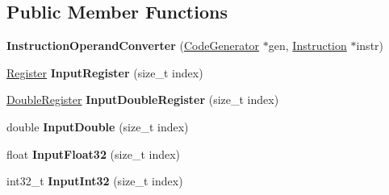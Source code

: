 \subsection*{Public Member Functions}
\begin{DoxyCompactItemize}
\item 
{\bfseries Instruction\+Operand\+Converter} (\hyperlink{classv8_1_1internal_1_1compiler_1_1_code_generator}{Code\+Generator} $\ast$gen, \hyperlink{classv8_1_1internal_1_1compiler_1_1_instruction}{Instruction} $\ast$instr)\hypertarget{classv8_1_1internal_1_1compiler_1_1_instruction_operand_converter_abe8f55c001867c1cd8885f5e956596ce}{}\label{classv8_1_1internal_1_1compiler_1_1_instruction_operand_converter_abe8f55c001867c1cd8885f5e956596ce}

\item 
\hyperlink{structv8_1_1internal_1_1_register}{Register} {\bfseries Input\+Register} (size\+\_\+t index)\hypertarget{classv8_1_1internal_1_1compiler_1_1_instruction_operand_converter_a0c4a3aa542e9795275013b4bdcb351c7}{}\label{classv8_1_1internal_1_1compiler_1_1_instruction_operand_converter_a0c4a3aa542e9795275013b4bdcb351c7}

\item 
\hyperlink{structv8_1_1internal_1_1_double_register}{Double\+Register} {\bfseries Input\+Double\+Register} (size\+\_\+t index)\hypertarget{classv8_1_1internal_1_1compiler_1_1_instruction_operand_converter_adeeef63cc1da054e6bfcedf907aabc2d}{}\label{classv8_1_1internal_1_1compiler_1_1_instruction_operand_converter_adeeef63cc1da054e6bfcedf907aabc2d}

\item 
double {\bfseries Input\+Double} (size\+\_\+t index)\hypertarget{classv8_1_1internal_1_1compiler_1_1_instruction_operand_converter_a1242b9760e6b99a3a73f6f7f7786965a}{}\label{classv8_1_1internal_1_1compiler_1_1_instruction_operand_converter_a1242b9760e6b99a3a73f6f7f7786965a}

\item 
float {\bfseries Input\+Float32} (size\+\_\+t index)\hypertarget{classv8_1_1internal_1_1compiler_1_1_instruction_operand_converter_a393135fab373714e807882e0f7343eae}{}\label{classv8_1_1internal_1_1compiler_1_1_instruction_operand_converter_a393135fab373714e807882e0f7343eae}

\item 
int32\+\_\+t {\bfseries Input\+Int32} (size\+\_\+t index)\hypertarget{classv8_1_1internal_1_1compiler_1_1_instruction_operand_converter_a40780ba19e32908ed218bafd27fde1ee}{}\label{classv8_1_1internal_1_1compiler_1_1_instruction_operand_converter_a40780ba19e32908ed218bafd27fde1ee}


\end{DoxyCompactItemize}
